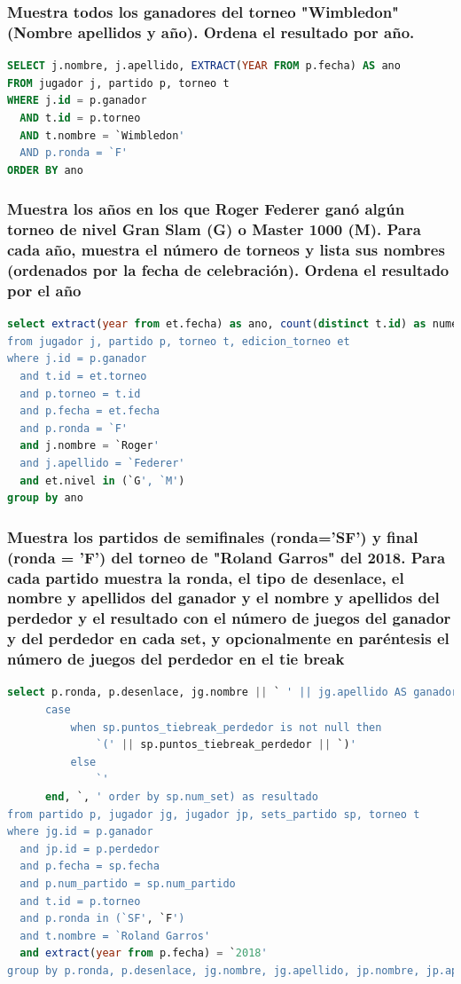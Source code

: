 \documentclass[10pt]{opticajnl}
\begin{document}
\subsubsection{Muestra todos los ganadores del torneo "Wimbledon" (Nombre apellidos y año). Ordena el resultado por año.}

\begin{lstlisting}[language=SQL]
SELECT j.nombre, j.apellido, EXTRACT(YEAR FROM p.fecha) AS ano
FROM jugador j, partido p, torneo t
WHERE j.id = p.ganador 
  AND t.id = p.torneo 
  AND t.nombre = `Wimbledon' 
  AND p.ronda = `F'
ORDER BY ano
\end{lstlisting}


\subsubsection{Muestra los años en los que Roger Federer ganó algún torneo de nivel Gran Slam (G) o Master 1000 (M). Para cada año, muestra el número de torneos y lista sus nombres (ordenados por la fecha de celebración). Ordena el resultado por el año}

\begin{lstlisting}[language=SQL]
select extract(year from et.fecha) as ano, count(distinct t.id) as numero_torneos, string_agg(t.nombre, `, ' order by et.fecha) as torneos
from jugador j, partido p, torneo t, edicion_torneo et
where j.id = p.ganador
  and t.id = et.torneo
  and p.torneo = t.id
  and p.fecha = et.fecha
  and p.ronda = `F'
  and j.nombre = `Roger'
  and j.apellido = `Federer'
  and et.nivel in (`G', `M')
group by ano
\end{lstlisting}

\subsubsection{Muestra los partidos de semiﬁnales (ronda='SF') y ﬁnal (ronda = 'F') del torneo de "Roland Garros" del 2018. Para cada partido muestra la ronda, el tipo de desenlace, el nombre y apellidos del ganador y el nombre y apellidos del perdedor y el resultado con el número de juegos del ganador y del perdedor en cada set, y opcionalmente en paréntesis el número de juegos del perdedor en el tie break}

\begin{lstlisting}[language=SQL]
select p.ronda, p.desenlace, jg.nombre || ` ' || jg.apellido AS ganador, jp.nombre || ` ' || jp.apellido AS perdedor, STRING_AGG(sp.juegos_ganador || `-' || sp.juegos_perdedor ||
      case
          when sp.puntos_tiebreak_perdedor is not null then
              `(' || sp.puntos_tiebreak_perdedor || `)'
          else
              `'
      end, `, ' order by sp.num_set) as resultado
from partido p, jugador jg, jugador jp, sets_partido sp, torneo t
where jg.id = p.ganador
  and jp.id = p.perdedor
  and p.fecha = sp.fecha
  and p.num_partido = sp.num_partido
  and t.id = p.torneo
  and p.ronda in (`SF', `F')
  and t.nombre = `Roland Garros'
  and extract(year from p.fecha) = `2018'
group by p.ronda, p.desenlace, jg.nombre, jg.apellido, jp.nombre, jp.apellido, p.fecha

\end{lstlisting}
\end{document}
